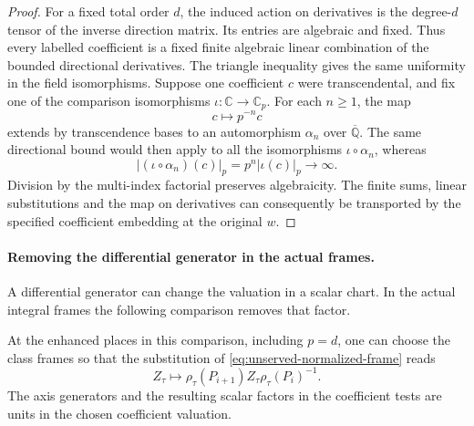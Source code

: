 \begin{proof}
For a fixed total order \(d\), the induced action on derivatives
is the degree-\(d\) tensor of the inverse direction matrix. Its
entries are algebraic and fixed. Thus every labelled coefficient
is a fixed finite algebraic linear combination of the bounded
directional derivatives. The triangle inequality gives the same
uniformity in the field isomorphisms.
Suppose one coefficient \(c\) were transcendental, and fix one
of the comparison isomorphisms \(\iota\colon\mathbb C\to\mathbb C_p\).
For each \(n\ge1\), the map 
\[
  c\mapsto p^{-n}c
\]
 extends by
transcendence bases to an automorphism \(\alpha_n\) over
\(\overline{\mathbb Q}\). The same directional bound would then
apply to all the isomorphisms \(\iota\circ\alpha_n\), whereas
\[
 |(\iota\circ\alpha_n)(c)|_p=p^n|\iota(c)|_p\longrightarrow\infty .
\] Division by the multi-index factorial preserves
algebraicity. The finite sums, linear substitutions and the
map on derivatives can consequently be transported by the
specified coefficient embedding at the original \(w\).

\end{proof}

\paragraph{Removing the differential generator in the actual frames.}

A differential generator can change the valuation in a scalar chart. In the actual integral frames the following comparison removes that factor.

\begin{proposition}\label{prop:unserved-normalized-frame}
At the enhanced places in this comparison, including \(p=d\),
one can choose the class frames so that the substitution of \eqref{eq:unserved-normalized-frame} reads
\[
 Z_\tau\longmapsto \rho_\tau(P_{i+1})Z_\tau\rho_\tau(P_i)^{-1}.
\]
 The axis
generators and the resulting scalar factors in the coefficient
tests are units in the chosen coefficient valuation.
\end{proposition}

